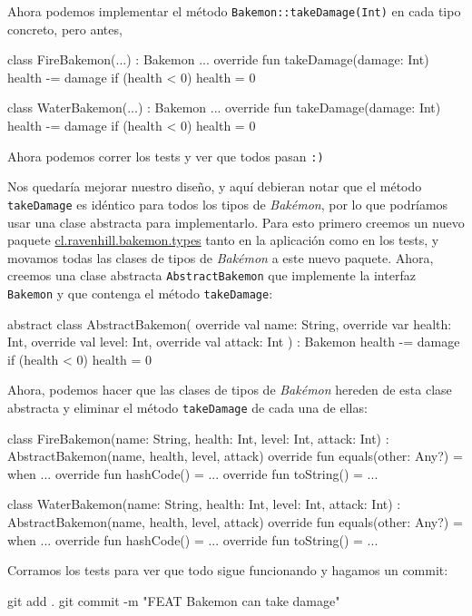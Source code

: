   Ahora podemos implementar el método \texttt{Bakemon::takeDamage(Int)} en cada tipo concreto, pero
  antes, 

  \begin{kotlin}
    class FireBakemon(...) : Bakemon {
      ...
      override fun takeDamage(damage: Int) {
        health -= damage
        if (health < 0) {
          health = 0
        }
      }
    }
  \end{kotlin}

  \begin{kotlin}
    class WaterBakemon(...) : Bakemon {
      ...
      override fun takeDamage(damage: Int) {
        health -= damage
        if (health < 0) {
          health = 0
        }
      }
    }
  \end{kotlin}
  
  Ahora podemos correr los tests y ver que todos pasan \texttt{:)}

  Nos quedaría mejorar nuestro diseño, y aquí debieran notar que el método \texttt{takeDamage}
  es idéntico para todos los tipos de \textit{Bakémon}, por lo que podríamos usar una clase
  abstracta para implementarlo.
  Para esto primero creemos un nuevo paquete \url{cl.ravenhill.bakemon.types} tanto en la aplicación
  como en los tests, y movamos todas las clases de tipos de \textit{Bakémon} a este nuevo paquete.
  Ahora, creemos una clase abstracta \texttt{AbstractBakemon} que implemente la interfaz
  \texttt{Bakemon} y que contenga el método \texttt{takeDamage}:

  \begin{kotlin}
    abstract class AbstractBakemon(
      override val name: String,
      override var health: Int,
      override val level: Int,
      override val attack: Int
    ) : Bakemon {
      health -= damage
      if (health < 0) {
        health = 0
      }
    }
  \end{kotlin}

  Ahora, podemos hacer que las clases de tipos de \textit{Bakémon} hereden de esta clase abstracta
  y eliminar el método \texttt{takeDamage} de cada una de ellas:

  \begin{kotlin}
    class FireBakemon(name: String, health: Int, level: Int, attack: Int) :
        AbstractBakemon(name, health, level, attack) {
      override fun equals(other: Any?) = when {...}
      override fun hashCode() = ...
      override fun toString() = ...
    }
  \end{kotlin}

  \begin{kotlin}
    class WaterBakemon(name: String, health: Int, level: Int, attack: Int) :
        AbstractBakemon(name, health, level, attack) {
      override fun equals(other: Any?) = when {...}
      override fun hashCode() = ...
      override fun toString() = ...
    }
  \end{kotlin}

  Corramos los tests para ver que todo sigue funcionando y hagamos un commit:

  \begin{powershell}
    git add .
    git commit -m "FEAT Bakemon can take damage"
  \end{powershell}